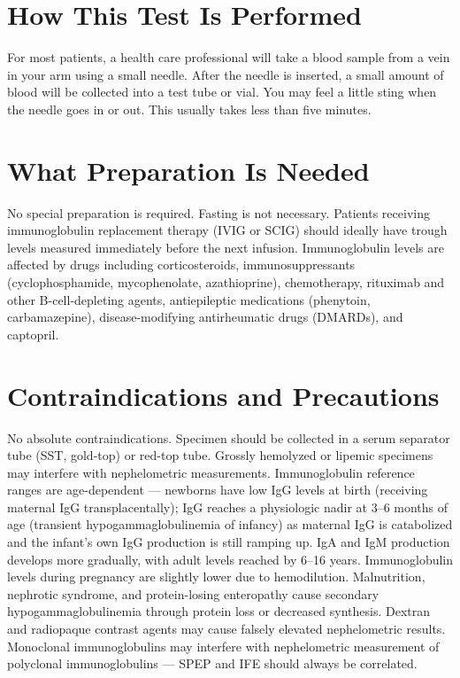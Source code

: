 \section*{How This Test Is Performed}
For most patients, a health care professional will take a blood sample from a vein in your arm using a small needle. After the needle is inserted, a small amount of blood will be collected into a test tube or vial. You may feel a little sting when the needle goes in or out. This usually takes less than five minutes.

\section*{What Preparation Is Needed}
No special preparation is required. Fasting is not necessary. Patients receiving immunoglobulin replacement therapy (IVIG or SCIG) should ideally have trough levels measured immediately before the next infusion. Immunoglobulin levels are affected by drugs including corticosteroids, immunosuppressants (cyclophosphamide, mycophenolate, azathioprine), chemotherapy, rituximab and other B-cell-depleting agents, antiepileptic medications (phenytoin, carbamazepine), disease-modifying antirheumatic drugs (DMARDs), and captopril.

\section*{Contraindications and Precautions}
No absolute contraindications. Specimen should be collected in a serum separator tube (SST, gold-top) or red-top tube. Grossly hemolyzed or lipemic specimens may interfere with nephelometric measurements. Immunoglobulin reference ranges are age-dependent --- newborns have low IgG levels at birth (receiving maternal IgG transplacentally); IgG reaches a physiologic nadir at 3--6 months of age (transient hypogammaglobulinemia of infancy) as maternal IgG is catabolized and the infant's own IgG production is still ramping up. IgA and IgM production develops more gradually, with adult levels reached by 6--16 years. Immunoglobulin levels during pregnancy are slightly lower due to hemodilution. Malnutrition, nephrotic syndrome, and protein-losing enteropathy cause secondary hypogammaglobulinemia through protein loss or decreased synthesis. Dextran and radiopaque contrast agents may cause falsely elevated nephelometric results. Monoclonal immunoglobulins may interfere with nephelometric measurement of polyclonal immunoglobulins --- SPEP and IFE should always be correlated.

